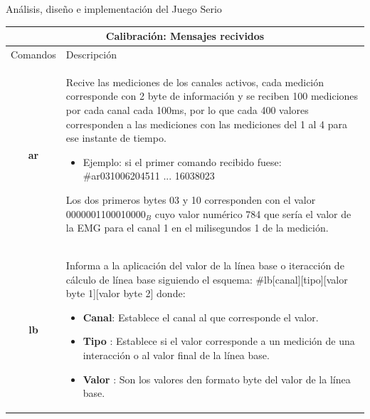 \begin{thesischapter}{2} {Análisis, diseño e implementación del Juego Serio}
\begin{table}[ht]
    \centering
    \begin{tabular}{ |c|p{14cm}|}
        \hline
        \multicolumn{2}{|c|}{Calibración: Mensajes recividos} \\
        \hline
        Comandos        &   Descripción \\\hline
        \textbf{ar}     &   \begin{minipage}{14cm}
                                \vspace{2pt}    
                                Recive las mediciones de los canales activos, cada medición corresponde con 2 byte de información y se reciben 100 mediciones por cada canal cada 100ms, 
                                por lo que cada 400 valores corresponden a las mediciones con las mediciones del 1 al 4 para ese instante de tiempo.
                                \begin{itemize}
                                    \item Ejemplo: si el primer comando recibido fuese: \#ar031006204511 ... 16038023
                                \end{itemize}
                                Los dos primeros bytes 03 y 10 corresponden con el valor 0000001100010000$_{B}$ cuyo valor numérico  784 que sería el valor de la EMG para el canal 1 en el milisegundos 
                                1 de la medición.
                                \vspace{2pt}    
                            \end{minipage}\\\hline    
        \textbf{lb}     &   \begin{minipage}{14cm}
                                \vspace{1pt}
                                Informa a la aplicación del valor de la línea base o iteracción de cálculo de línea base siguiendo el esquema: \#lb[canal][tipo][valor byte 1][valor byte 2] donde:
                                \begin{itemize}
                                    \item \textbf{Canal}: Establece el canal al que corresponde el valor.
                                    \item \textbf{Tipo} : Establece si el valor corresponde a un medición de una interacción o al valor final de la línea base.
                                    \item \textbf{Valor} : Son los valores den formato byte del valor de la línea base.  

\end{itemize}
\end{minipage}
\end{tabular}
\end{table}
\end{thesischapter}
